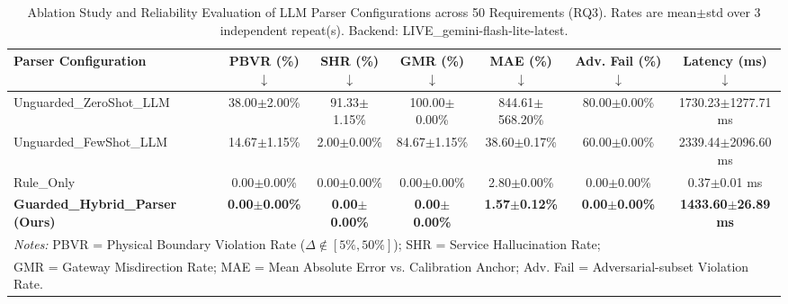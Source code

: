 \begin{table}[t]
\centering
\caption{Ablation Study and Reliability Evaluation of LLM Parser Configurations across 50 Requirements (RQ3).
Rates are mean$\pm$std over 3 independent repeat(s). Backend: LIVE\_gemini-flash-lite-latest.}
\label{tab:parser_ablation}
\begin{tabular}{lcccccc}
\toprule
\textbf{Parser Configuration} & \textbf{PBVR (\%)} $\downarrow$ & \textbf{SHR (\%)} $\downarrow$ & \textbf{GMR (\%)} $\downarrow$ & \textbf{MAE (\%)} $\downarrow$ & \textbf{Adv. Fail (\%)} $\downarrow$ & \textbf{Latency (ms)} $\downarrow$ \\
\midrule
Unguarded\_ZeroShot\_LLM & 38.00$\pm$2.00\% & 91.33$\pm$1.15\% & 100.00$\pm$0.00\% & 844.61$\pm$568.20\% & 80.00$\pm$0.00\% & 1730.23$\pm$1277.71 ms \\
Unguarded\_FewShot\_LLM & 14.67$\pm$1.15\% & 2.00$\pm$0.00\% & 84.67$\pm$1.15\% & 38.60$\pm$0.17\% & 60.00$\pm$0.00\% & 2339.44$\pm$2096.60 ms \\
Rule\_Only & 0.00$\pm$0.00\% & 0.00$\pm$0.00\% & 0.00$\pm$0.00\% & 2.80$\pm$0.00\% & 0.00$\pm$0.00\% & 0.37$\pm$0.01 ms \\
\textbf{Guarded\_Hybrid\_Parser (Ours)} & \textbf{0.00$\pm$0.00\%} & \textbf{0.00$\pm$0.00\%} & \textbf{0.00$\pm$0.00\%} & \textbf{1.57$\pm$0.12\%} & \textbf{0.00$\pm$0.00\%} & \textbf{1433.60$\pm$26.89 ms} \\
\bottomrule
\multicolumn{7}{l}{\footnotesize \textit{Notes:} PBVR = Physical Boundary Violation Rate ($\Delta \notin [5\%, 50\%]$); SHR = Service Hallucination Rate;} \\
\multicolumn{7}{l}{\footnotesize GMR = Gateway Misdirection Rate; MAE = Mean Absolute Error vs. Calibration Anchor; Adv. Fail = Adversarial-subset Violation Rate.}
\end{tabular}
\end{table}
